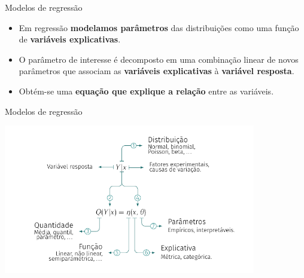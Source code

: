 \documentclass[
  ignorenonframetext,
  serif,
  professionalfont,
  usenames,
  dvipsnames,
  aspectratio = 169]{beamer}
\begin{document}
\begin{frame}{Modelos de regressão}
\protect\hypertarget{modelos-de-regressuxe3o-3}{}
\begin{itemize}
    \itemsep 2ex

  \item Em regressão \textbf{modelamos parâmetros} das distribuições como uma função de \textbf{variáveis explicativas}.
  
  \item O parâmetro de interesse é decomposto em uma combinação linear de novos parâmetros que associam as \textbf{variáveis explicativas} à \textbf{variável resposta}.
  
  \item Obtém-se uma \textbf{equação que explique a relação} entre as variáveis. 
  
  \end{itemize}
\end{frame}

\begin{frame}{Modelos de regressão}
\protect\hypertarget{modelos-de-regressuxe3o-4}{}
\begin{center}\includegraphics[width=11cm]{./img/modelos_regressao} \end{center}
\end{frame}
\end{document}
